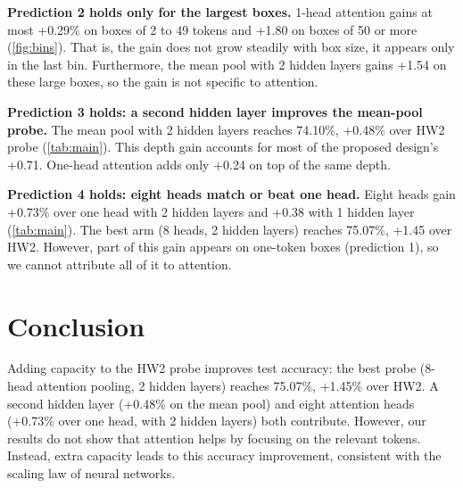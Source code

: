 \documentclass{article} %
\begin{document}
\textbf{Prediction 2 holds only for the largest boxes.}
1-head attention gains at most +0.29\% on boxes of 2 to 49 tokens and +1.80 on boxes of 50 or more (\cref{fig:bins}).
That is, the gain does not grow steadily with box size, it appears only in the last bin.
Furthermore, the mean pool with 2 hidden layers gains +1.54 on these large boxes, so the gain is not specific to attention.

\textbf{Prediction 3 holds: a second hidden layer improves the mean-pool probe.}
The mean pool with 2 hidden layers reaches 74.10\%, +0.48\% over HW2 probe (\cref{tab:main}).
This depth gain accounts for most of the proposed design's +0.71.
One-head attention adds only +0.24 on top of the same depth.

\textbf{Prediction 4 holds: eight heads match or beat one head.}
Eight heads gain +0.73\% over one head with 2 hidden layers and +0.38 with 1 hidden layer (\cref{tab:main}).
The best arm (8 heads, 2 hidden layers) reaches 75.07\%, +1.45 over HW2.
However, part of this gain appears on one-token boxes (prediction 1), so we cannot attribute all of it to attention.

\section{Conclusion}

Adding capacity to the HW2 probe improves test accuracy: the best probe (8-head attention pooling, 2 hidden layers) reaches 75.07\%, +1.45\% over HW2.
A second hidden layer (+0.48\% on the mean pool) and eight attention heads (+0.73\% over one head, with 2 hidden layers) both contribute. However, our results do not show that attention helps by focusing on the relevant tokens. Instead, extra capacity leads to this accuracy improvement, consistent with the scaling law \citep{kaplan2020scalinglawsneurallanguage} of neural networks.





\end{document}
